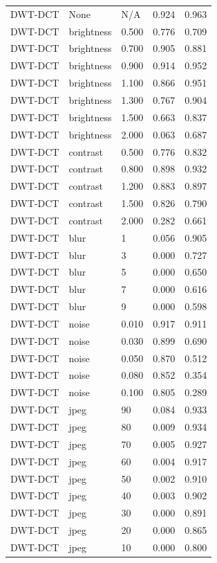 \begin{table}
\begin{tabular}{lllrr}
DWT-DCT & None & N/A & 0.924 & 0.963 \\
DWT-DCT & brightness & 0.500 & 0.776 & 0.709 \\
DWT-DCT & brightness & 0.700 & 0.905 & 0.881 \\
DWT-DCT & brightness & 0.900 & 0.914 & 0.952 \\
DWT-DCT & brightness & 1.100 & 0.866 & 0.951 \\
DWT-DCT & brightness & 1.300 & 0.767 & 0.904 \\
DWT-DCT & brightness & 1.500 & 0.663 & 0.837 \\
DWT-DCT & brightness & 2.000 & 0.063 & 0.687 \\
DWT-DCT & contrast & 0.500 & 0.776 & 0.832 \\
DWT-DCT & contrast & 0.800 & 0.898 & 0.932 \\
DWT-DCT & contrast & 1.200 & 0.883 & 0.897 \\
DWT-DCT & contrast & 1.500 & 0.826 & 0.790 \\
DWT-DCT & contrast & 2.000 & 0.282 & 0.661 \\
DWT-DCT & blur & 1 & 0.056 & 0.905 \\
DWT-DCT & blur & 3 & 0.000 & 0.727 \\
DWT-DCT & blur & 5 & 0.000 & 0.650 \\
DWT-DCT & blur & 7 & 0.000 & 0.616 \\
DWT-DCT & blur & 9 & 0.000 & 0.598 \\
DWT-DCT & noise & 0.010 & 0.917 & 0.911 \\
DWT-DCT & noise & 0.030 & 0.899 & 0.690 \\
DWT-DCT & noise & 0.050 & 0.870 & 0.512 \\
DWT-DCT & noise & 0.080 & 0.852 & 0.354 \\
DWT-DCT & noise & 0.100 & 0.805 & 0.289 \\
DWT-DCT & jpeg & 90 & 0.084 & 0.933 \\
DWT-DCT & jpeg & 80 & 0.009 & 0.934 \\
DWT-DCT & jpeg & 70 & 0.005 & 0.927 \\
DWT-DCT & jpeg & 60 & 0.004 & 0.917 \\
DWT-DCT & jpeg & 50 & 0.002 & 0.910 \\
DWT-DCT & jpeg & 40 & 0.003 & 0.902 \\
DWT-DCT & jpeg & 30 & 0.000 & 0.891 \\
DWT-DCT & jpeg & 20 & 0.000 & 0.865 \\
DWT-DCT & jpeg & 10 & 0.000 & 0.800 \\

\end{tabular}
\end{table}
